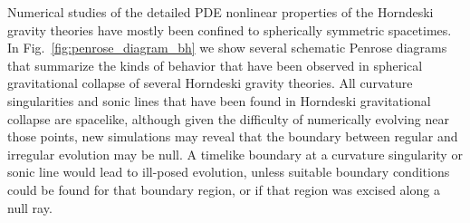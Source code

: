 \documentclass{ws-ijmpd}
\begin{document}
Numerical studies of the detailed PDE nonlinear
properties of the Horndeski
gravity theories have mostly been confined to spherically
symmetric spacetimes.
In Fig.~\ref{fig:penrose_diagram_bh} we show 
several schematic Penrose diagrams that summarize the 
kinds of behavior that have been observed in spherical
gravitational collapse of several Horndeski gravity theories.
All curvature singularities and sonic lines that have
been found in Horndeski gravitational collapse are spacelike, 
although given the difficulty of numerically evolving near those
points, new simulations may reveal that the boundary between
regular and irregular evolution may be null. 
A timelike boundary at a curvature singularity or sonic line
would lead to ill-posed evolution, unless suitable boundary
conditions could be found for that boundary region, or
if that region was excised along a null ray.
\end{document}
